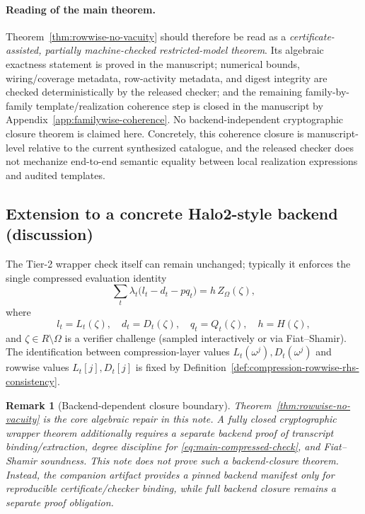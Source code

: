 ﻿\documentclass[11pt]{article}
\newtheorem{remark}[theorem]{Remark}
\begin{document}
\paragraph{Reading of the main theorem.}
Theorem~\ref{thm:rowwise-no-vacuity} should therefore be read as a
\emph{certificate-assisted, partially machine-checked restricted-model theorem}.
Its algebraic exactness statement is proved in the manuscript; numerical bounds,
wiring/coverage metadata, row-activity metadata, and digest integrity are
checked deterministically by the released checker; and the remaining
family-by-family template/realization coherence step is closed in the manuscript
by Appendix~\ref{app:familywise-coherence}. No backend-independent cryptographic
closure theorem is claimed here.
Concretely, this coherence closure is manuscript-level relative to the current
synthesized catalogue, and the released checker does not mechanize end-to-end
semantic equality between local realization expressions and audited templates.

\subsection{Extension to a concrete Halo2-style backend (discussion)}

The Tier-2 wrapper check itself can remain unchanged; typically it enforces the
single compressed evaluation identity
\begin{equation}
\sum_t \lambda_t\bigl(l_t-d_t-pq_t\bigr) = h\,Z_\Omega(\zeta),
\label{eq:main-compressed-check}
\end{equation}
where
\[
l_t = L_t(\zeta),\quad
d_t = D_t(\zeta),\quad
q_t = Q_t(\zeta),\quad
h = H(\zeta),
\]
and \(\zeta \in R\setminus \Omega\) is a verifier challenge (sampled interactively
or via Fiat--Shamir).
The identification between compression-layer values
\(L_t(\omega^j),D_t(\omega^j)\) and rowwise values \(L_t[j],D_t[j]\) is fixed
by Definition~\ref{def:compression-rowwise-rhs-consistency}.

\begin{remark}[Backend-dependent closure boundary]
\label{rem:wrapper-extension}
Theorem~\ref{thm:rowwise-no-vacuity} is the core algebraic repair in this note.
A fully closed cryptographic wrapper theorem additionally requires a separate
backend proof of transcript binding/extraction, degree discipline for
\eqref{eq:main-compressed-check}, and Fiat--Shamir soundness.
This note does not prove such a backend-closure theorem.
Instead, the companion artifact provides a pinned backend manifest only for
reproducible certificate/checker binding, while full backend closure remains a
separate proof obligation.
\end{remark}
\end{document}

